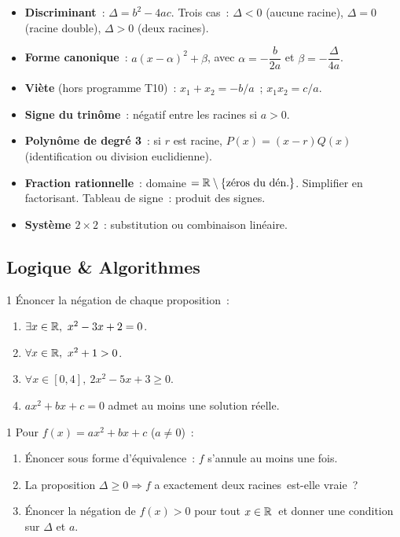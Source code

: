 \begin{bilan}
\begin{itemize}
  \item \textbf{Discriminant}~: $\Delta = b^2-4ac$.
        Trois cas~: $\Delta<0$ (aucune racine), $\Delta=0$ (racine double),
        $\Delta>0$ (deux racines).
  \item \textbf{Forme canonique}~: $a(x-\alpha)^2+\beta$,
        avec $\alpha=-\dfrac{b}{2a}$ et $\beta=-\dfrac{\Delta}{4a}$.
  \item \textbf{Vi\`ete} (hors programme T10)~: $x_1+x_2=-b/a$~; $x_1 x_2=c/a$.
  \item \textbf{Signe du trin\^ome}~: n\'egatif entre les racines si $a>0$.
  \item \textbf{Polyn\^ome de degr\'e 3}~: si $r$ est racine,
        $P(x)=(x-r)Q(x)$ (identification ou division euclidienne).
  \item \textbf{Fraction rationnelle}~: domaine $=\mathbb{R}\setminus\{\text{z\'eros du d\'en.}\}$.
        Simplifier en factorisant. Tableau de signe~: produit des signes.
  \item \textbf{Syst\`eme $2\times2$}~: substitution ou combinaison lin\'eaire.
\end{itemize}

\subsection*{Logique \& Algorithmes}

\begin{exo}{1}
\'Enoncer la n\'egation de chaque proposition~:
\begin{enumerate}
  \item $\exists x\in\R,\ x^2-3x+2=0$.
  \item $\forall x\in\R,\ x^2+1>0$.
  \item $\forall x\in[0,4],\ 2x^2-5x+3\geq0$.
  \item \og $ax^2+bx+c=0$ admet au moins une solution r\'eelle.\fg
\end{enumerate}
\end{exo}

\begin{exo}{1}
Pour $f(x)=ax^2+bx+c$ ($a\ne0$)~:
\begin{enumerate}
  \item \'Enoncer sous forme d'\'equivalence~:
        \og $f$ s'annule au moins une fois.\fg
  \item La proposition \og $\Delta\geq0\Rightarrow f$ a exactement deux racines\fg\
        est-elle vraie~?
  \item \'Enoncer la n\'egation de \og $f(x)>0$ pour tout $x\in\mathbb{R}$\fg\
        et donner une condition sur $\Delta$ et $a$.
\end{enumerate}
\end{exo}


\end{bilan}
